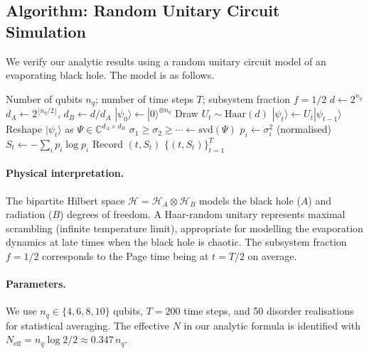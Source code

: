 \documentclass[12pt,a4paper]{article}
\newcommand{\CC}{\mathbb{C}}
\begin{document}
\subsection{Algorithm: Random Unitary Circuit Simulation}
\label{subsec:algorithm}

We verify our analytic results using a random unitary circuit model of an
evaporating black hole.  The model is as follows.

\begin{algorithm}[H]
\caption{Finite-$N$ Page Curve Simulation via Random Unitary Circuits}
\label{alg:ruc}
\begin{algorithmic}[1]
  \Require Number of qubits $n_q$; number of time steps $T$;
    subsystem fraction $f = 1/2$
  \State $d \leftarrow 2^{n_q}$ 
  \State $d_A \leftarrow 2^{\lfloor n_q/2\rfloor}$,
    $d_B \leftarrow d/d_A$ 
  \State $|\psi_0\rangle \leftarrow |0\rangle^{\otimes n_q}$
    \State Draw $U_t \sim \mathrm{Haar}(d)$ 
    \State $|\psi_t\rangle \leftarrow U_t |\psi_{t-1}\rangle$
    \State Reshape $|\psi_t\rangle$ as $\Psi \in \CC^{d_A \times d_B}$
    \State $\sigma_1 \ge \sigma_2 \ge \cdots \leftarrow
      \mathrm{svd}(\Psi)$ 
    \State $p_i \leftarrow \sigma_i^2$ (normalised)
    \State $S_t \leftarrow -\sum_i p_i \log p_i$
    \State Record $(t, S_t)$
  \EndFor
  \State \Return $\{(t, S_t)\}_{t=1}^T$
\end{algorithmic}
\end{algorithm}

\paragraph{Physical interpretation.}
The bipartite Hilbert space $\mathcal{H} = \mathcal{H}_A \otimes \mathcal{H}_B$
models the black hole ($A$) and radiation ($B$) degrees of freedom.
A Haar-random unitary represents maximal scrambling (infinite temperature
limit), appropriate for modelling the evaporation dynamics at late times
when the black hole is chaotic.  The subsystem fraction $f=1/2$ corresponds
to the Page time being at $t = T/2$ on average.

\paragraph{Parameters.}
We use $n_q \in \{4, 6, 8, 10\}$ qubits, $T = 200$ time steps,
and 50 disorder realisations for statistical averaging.
The effective $N$ in our analytic formula is identified with
$N_{\mathrm{eff}} = n_q \log 2 / 2 \approx 0.347\, n_q$.
\end{document}
